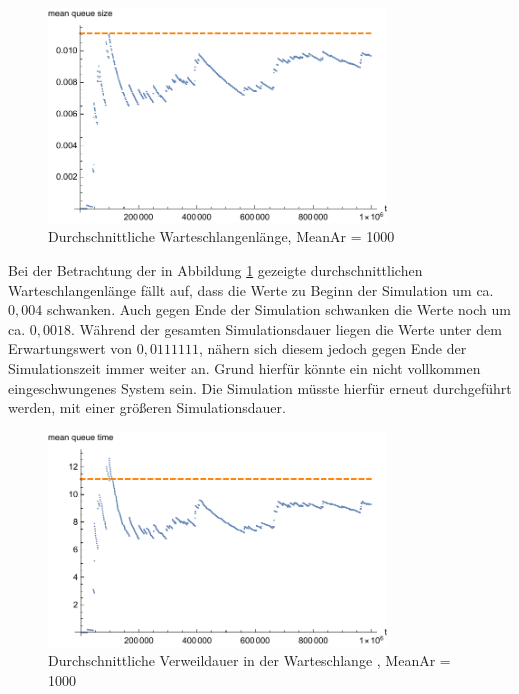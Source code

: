 \begin{figure}[htpb]
	\centering
	\includegraphics[width=0.8\textwidth]{abbildungen/1_Phone/Arrival_1000_Serve_100_dur_1000000_Skip_0/MeanQueueSize.pdf}
	\caption{Durchschnittliche Warteschlangenlänge, MeanAr = 1000}
	\label{fig:meanQueueSize1000}
\end{figure}

Bei der Betrachtung der in Abbildung \ref{fig:meanQueueSize1000} gezeigte durchschnittlichen Warteschlangenlänge fällt auf, dass die Werte zu Beginn der Simulation um ca. $0,004$ schwanken. Auch gegen Ende der Simulation schwanken die Werte noch um ca. $0,0018$. Während der gesamten Simulationsdauer liegen die Werte unter dem Erwartungswert von $0,0111111$, nähern sich diesem jedoch gegen Ende der Simulationszeit immer weiter an. Grund hierfür könnte ein nicht vollkommen eingeschwungenes System sein. Die Simulation müsste hierfür erneut durchgeführt werden, mit einer größeren Simulationsdauer.

\begin{figure}[htpb]
	\centering
	\includegraphics[width=0.8\textwidth]{abbildungen/1_Phone/Arrival_1000_Serve_100_dur_1000000_Skip_0/MeanQueueTime.pdf}
	\caption{Durchschnittliche Verweildauer in der Warteschlange , MeanAr = 1000}
	\label{fig:meanQueueTime1000}
\end{figure} 

